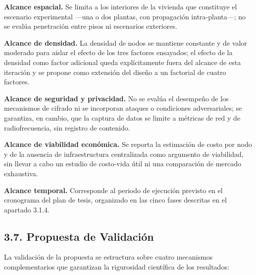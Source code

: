 \documentclass[
  12pt,
]{article}
\begin{document}
\textbf{Alcance espacial.} Se limita a los interiores de la vivienda que
constituye el escenario experimental —una o dos plantas, con propagación
intra-planta—; no se evalúa penetración entre pisos ni escenarios
exteriores.

\textbf{Alcance de densidad.} La densidad de nodos se mantiene constante
y de valor moderado para aislar el efecto de los tres factores
ensayados; el efecto de la densidad como factor adicional queda
explícitamente fuera del alcance de esta iteración y se propone como
extensión del diseño a un factorial de cuatro factores.

\textbf{Alcance de seguridad y privacidad.} No se evalúa el desempeño de
los mecanismos de cifrado ni se incorporan ataques o condiciones
adversariales; se garantiza, en cambio, que la captura de datos se
limite a métricas de red y de radiofrecuencia, sin registro de
contenido.

\textbf{Alcance de viabilidad económica.} Se reporta la estimación de
costo por nodo y de la ausencia de infraestructura centralizada como
argumento de viabilidad, sin llevar a cabo un estudio de costo-vida útil
ni una comparación de mercado exhaustiva.

\textbf{Alcance temporal.} Corresponde al periodo de ejecución previsto
en el cronograma del plan de tesis, organizado en las cinco fases
descritas en el apartado 3.1.4.

\subsection{3.7. Propuesta de
Validación}\label{propuesta-de-validaciuxf3n}

La validación de la propuesta se estructura sobre cuatro mecanismos
complementarios que garantizan la rigurosidad científica de los
resultados:
\end{document}
